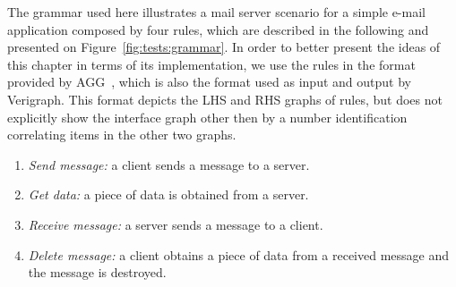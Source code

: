 \begin{example} %
The grammar used here illustrates a mail server scenario for a simple e-mail application composed by four rules, which are described in the following and presented on Figure~\ref{fig:tests:grammar}. In order to better present the ideas of this chapter in terms of its implementation, we use the rules in the format provided by AGG~\cite{Taentzer2000}, which is also the format used as input and output by Verigraph. This format depicts the LHS and RHS graphs of rules, but does not explicitly show
  the interface graph other then by a number identification correlating items in the other two graphs.

\begin{enumerate}[label=(\alph*),start=1]
  \item \emph{Send message:} a client sends a message to a server.
  \item \emph{Get data:} a piece of data is obtained from a server.
  \item \emph{Receive message:} a server sends a message to a client.
  \item \emph{Delete message:} a client obtains a piece of data from a received message and the message is destroyed.
\end{enumerate}
\end{example}
%

